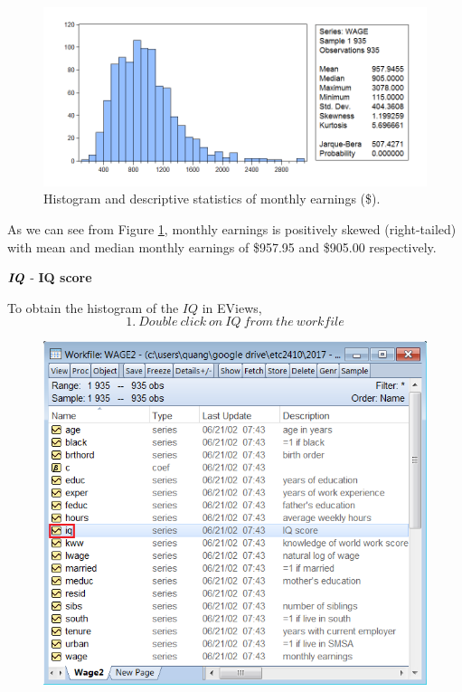\documentclass[12pt]{report}
\begin{document}
\vspace{-\baselineskip}
\begin{figure}[H]
\centerline{\includegraphics{q3_3}}
\caption{Histogram and descriptive statistics of monthly earnings (\$).}
\label{fig:hist1}
\end{figure}
\vspace{-\baselineskip}
\noindent As we can see from Figure \ref{fig:hist1}, monthly earnings is positively skewed (right-tailed) with mean and median monthly earnings of \$957.95 and \$905.00 respectively. \par
\begin{center}
$\textbf{\textit{IQ}}$ - \textbf{IQ score}
\end{center}
\noindent To obtain the histogram of the $IQ$ in EViews,
$$1.\ Double\ click\ on\ IQ\ from\ the\ workfile$$
\begin{figure}[H]
	\centering
	\includegraphics{q3_4}
\end{figure}
\end{document}
